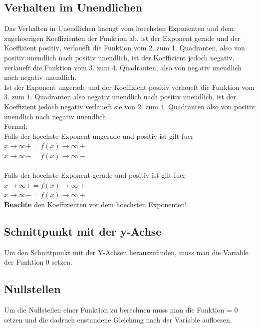 \documentclass[a4paper]{article} %
\begin{document}
	\subsection{Verhalten im Unendlichen}
	Das Verhalten in Unendlichen haengt vom hoechsten Exponenten und dem zugehoerigen Koeffizienten der Funktion ab, ist der Exponent gerade und der Koeffizient positiv, verlaueft die Funktion vom 2. zum 1. Quadranten, also von positiv unendlich nach positiv unendlich, ist der Koeffizient jedoch negativ, verlaueft die Funktion vom 3. zum 4. Quadranten, also von negativ unendlich nach negativ unendlich.\\
	Ist der Exponent ungerade und der Koeffizient positiv verlaueft die Funktion vom 3. zum 1. Quadranten also negativ unendlich nach positiv unendlich, ist der Koeffizient jedoch negativ verlaueft sie von 2. zum 4. Quadranten also von positiv unendlich nach negativ unendlich.\\
	Formal: \\
	Falls der hoechste Exponent ungerade und positiv ist gilt fuer $x\rightarrow\infty+ = f(x)\rightarrow\infty+$\\
	\hspace*{8.9cm} 	$x\rightarrow\infty- = f(x)\rightarrow\infty-$\\\\
	Falls der hoechste Exponent gerade und positiv ist gilt fuer $x\rightarrow\infty+ = f(x)\rightarrow\infty+$\\
	\hspace*{8.5cm} 	$x\rightarrow\infty- = f(x)\rightarrow\infty+$\\
	\textbf{Beachte} den Koeffizienten vor dem hoechsten Exponenten!


	\subsection{Schnittpunkt mit der y-Achse}
	Um den Schnittpunkt mit der Y-Achsen herauszufinden, muss man die Variable der Funktion 0 setzen.
	\subsection{Nullstellen}
	Um die Nullstellen einer Funktion zu berechnen muss man die Funktion = $0$ setzen und die dadruch enstandene Gleichung nach der Variable aufloesen.
\end{document}
